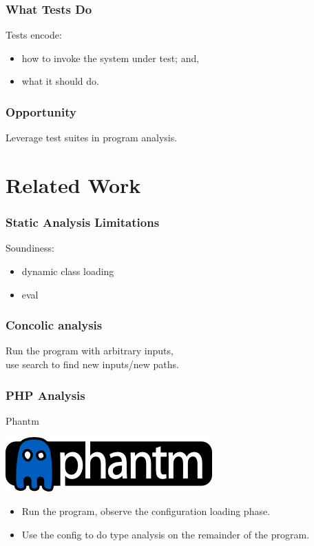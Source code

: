 \documentclass{beamer}
\newenvironment{changemargin}[1]{%
  \begin{list}{}{%
    \setlength{\topsep}{0pt}%
    \setlength{\leftmargin}{#1}%
    \setlength{\rightmargin}{1em}
    \setlength{\listparindent}{\parindent}%
    \setlength{\itemindent}{\parindent}%
    \setlength{\parsep}{\parskip}%
  }%
  \item[]}{\end{list}}
\begin{document}
\begin{frame}
  \frametitle{What Tests Do}

\Large 
\begin{changemargin}{1cm}
Tests encode:
\begin{itemize}
\item how to invoke the system under test; and,
\item what it should do.
\end{itemize}
\end{changemargin}

\end{frame}

\begin{frame}
  \frametitle{Opportunity}
\begin{center}
\Large
  Leverage test suites in program analysis.
\end{center}
\end{frame}

\section{Related Work}

\begin{frame}
  \frametitle{Static Analysis Limitations}
Soundiness:
\begin{itemize}
\item dynamic class loading
\item eval
\end{itemize}
\end{frame}


\begin{frame}
  \frametitle{Concolic analysis}

Run the program with arbitrary inputs, \\
use search to find new inputs/new paths.
\end{frame}

\begin{frame}
  \frametitle{PHP Analysis}

Phantm
\begin{center}
\includegraphics[width=.2\textwidth]{images/phantm-blue-solid.png}
\end{center}
\begin{itemize}
\item Run the program, observe the configuration loading phase.
\item Use the config to do type analysis on the remainder of the program.
\end{itemize}
\end{frame}
\end{document}

